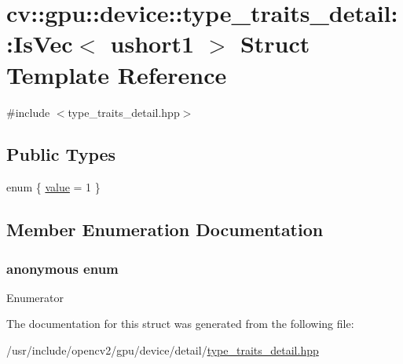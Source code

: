 \hypertarget{structcv_1_1gpu_1_1device_1_1type__traits__detail_1_1IsVec_3_01ushort1_01_4}{\section{cv\-:\-:gpu\-:\-:device\-:\-:type\-\_\-traits\-\_\-detail\-:\-:Is\-Vec$<$ ushort1 $>$ Struct Template Reference}
\label{structcv_1_1gpu_1_1device_1_1type__traits__detail_1_1IsVec_3_01ushort1_01_4}
}


{\ttfamily \#include $<$type\-\_\-traits\-\_\-detail.\-hpp$>$}

\subsection*{Public Types}
\begin{DoxyCompactItemize}
\item 
enum \{ \hyperlink{structcv_1_1gpu_1_1device_1_1type__traits__detail_1_1IsVec_3_01ushort1_01_4_ac66a9a0d5d7371c1f01ba625fce1b91ea25cf1b77384e1e9bb08eb89e2fe59f1a}{value} = 1
 \}
\end{DoxyCompactItemize}


\subsection{Member Enumeration Documentation}
\hypertarget{structcv_1_1gpu_1_1device_1_1type__traits__detail_1_1IsVec_3_01ushort1_01_4_ac66a9a0d5d7371c1f01ba625fce1b91e}{\subsubsection[{anonymous enum}]{\setlength{\rightskip}{0pt plus 5cm}anonymous enum}}\label{structcv_1_1gpu_1_1device_1_1type__traits__detail_1_1IsVec_3_01ushort1_01_4_ac66a9a0d5d7371c1f01ba625fce1b91e}
\begin{Desc}
\item[Enumerator]\par
\begin{description}
\item[{\em 
\hypertarget{structcv_1_1gpu_1_1device_1_1type__traits__detail_1_1IsVec_3_01ushort1_01_4_ac66a9a0d5d7371c1f01ba625fce1b91ea25cf1b77384e1e9bb08eb89e2fe59f1a}{value}\label{structcv_1_1gpu_1_1device_1_1type__traits__detail_1_1IsVec_3_01ushort1_01_4_ac66a9a0d5d7371c1f01ba625fce1b91ea25cf1b77384e1e9bb08eb89e2fe59f1a}
}]\end{description}
\end{Desc}


The documentation for this struct was generated from the following file\-:\begin{DoxyCompactItemize}
\item 
/usr/include/opencv2/gpu/device/detail/\hyperlink{type__traits__detail_8hpp}{type\-\_\-traits\-\_\-detail.\-hpp}\end{DoxyCompactItemize}

